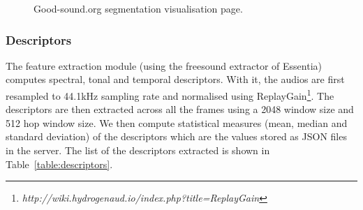\documentclass{article}
\begin{document}
\begin{figure}[ht]
 \centerline{}
 \caption{Good-sound.org segmentation visualisation page.}
 \label{fig:segmentation}
\end{figure}

\subsubsection{Descriptors}
The feature extraction module (using the freesound extractor of Essentia) computes spectral, tonal and temporal descriptors. With it, the audios are first resampled to 44.1kHz sampling rate and normalised using ReplayGain\footnote{\textit{http://wiki.hydrogenaud.io/index.php?title=ReplayGain}}. The descriptors are then extracted across all the frames using a 2048 window size and 512 hop window size. We then compute statistical measures (mean, median and standard deviation) of the descriptors which are the values stored as JSON files in the server. The list of the descriptors extracted is shown in Table~\ref{table:descriptors}. 
\end{document}

